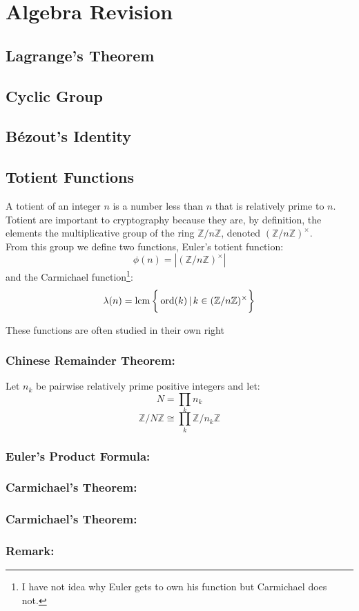 
\section{Algebra Revision}
\subsection{Lagrange's Theorem}
\subsection{Cyclic Group}
\subsection{Bézout's Identity}
\subsection{Totient Functions}
A totient of an integer $n$ is a number less than $n$ that is relatively prime to $n$.
Totient are important to cryptography because they are, by definition, the elements the multiplicative group of the ring $\mathbb{Z}/n\mathbb{Z}$,
denoted $(\mathbb{Z}/n\mathbb{Z})^\times$.
\\

From this group we define two functions,
Euler's totient function:
\[\phi(n) = |(\mathbb{Z}/n\mathbb{Z})^\times|\]
and the Carmichael function\footnote{I have not idea why Euler gets to own his function but Carmichael does not.}:
\[\lambda(n) = \operatorname{lcm}\bigg\{\operatorname{ord}(k)\,|\, k\in(\mathbb{Z}/n\mathbb{Z})^\times\bigg\}\]

These functions are often studied in their own right

\subsubsection{Chinese Remainder Theorem:}
Let $n_k$ be pairwise relatively prime positive integers and let:
\[N =\prod_k n_k \]
\[\mathbb{Z}/N\mathbb{Z} \cong \prod_k\mathbb{Z}/n_k\mathbb{Z}\]
\subsubsection{Euler's Product Formula:}
\subsubsection{Carmichael's Theorem:}
\subsubsection{Carmichael's Theorem:}
\subsubsection{Remark:}
